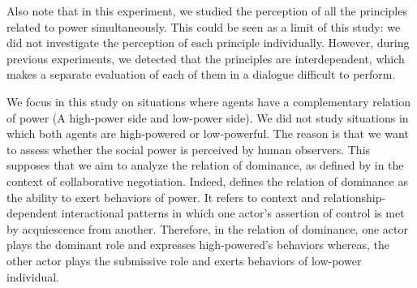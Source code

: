 \documentclass{llncs}
\begin{document}
		\medskip
		Also note that in this experiment, we studied the perception of all the principles related to power simultaneously. This could be seen as a limit of this study: we did not investigate the perception of each principle individually. However, during previous experiments, we detected that the principles are interdependent, which makes a separate evaluation of each of them in a dialogue difficult to perform.
		
		\medskip
		We focus in this study on situations where agents have a complementary relation of power (A high-power side and low-power side). We did not study situations in which both agents are high-powered or low-powerful. The reason is that we want to assess whether the social power is perceived by human observers. This supposes that we aim to analyze the relation of dominance, as defined by \cite{burgoonnonverbal} in the context of collaborative negotiation. Indeed, \cite{burgoonnonverbal} defines the relation of dominance as the ability to exert behaviors of power. It refers to context and relationship-dependent interactional  patterns in which one actor’s assertion of control is met by acquiescence from another. Therefore, in the relation of dominance, one actor plays the dominant role and expresses high-powered's behaviors whereas, the other actor plays the submissive role and exerts behaviors of low-power individual.
		
\end{document}
